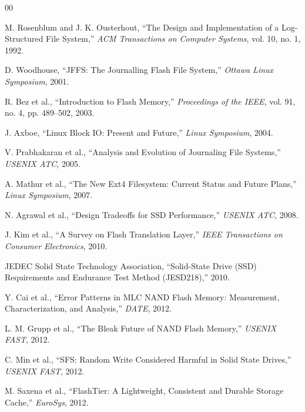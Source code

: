 \documentclass[conference]{IEEEtran}
\begin{document}
\begin{thebibliography}{00}

 M. Rosenblum and J. K. Ousterhout, ``The Design and Implementation of a Log-Structured File System,'' \textit{ACM Transactions on Computer Systems}, vol. 10, no. 1, 1992.

 D. Woodhouse, ``JFFS: The Journalling Flash File System,'' \textit{Ottawa Linux Symposium}, 2001.


 R. Bez et al., ``Introduction to Flash Memory,'' \textit{Proceedings of the IEEE}, vol. 91, no. 4, pp. 489--502, 2003.

 J. Axboe, ``Linux Block IO: Present and Future,'' \textit{Linux Symposium}, 2004.


 V. Prabhakaran et al., ``Analysis and Evolution of Journaling File Systems,'' \textit{USENIX ATC}, 2005.

 A. Mathur et al., ``The New Ext4 Filesystem: Current Status and Future Plans,'' \textit{Linux Symposium}, 2007.

 N. Agrawal et al., ``Design Tradeoffs for SSD Performance,'' \textit{USENIX ATC}, 2008.

 J. Kim et al., ``A Survey on Flash Translation Layer,'' \textit{IEEE Transactions on Consumer Electronics}, 2010.

 JEDEC Solid State Technology Association, ``Solid-State Drive (SSD) Requirements and Endurance Test Method (JESD218),'' 2010.

 Y. Cai et al., ``Error Patterns in MLC NAND Flash Memory: Measurement, Characterization, and Analysis,'' \textit{DATE}, 2012.

 L. M. Grupp et al., ``The Bleak Future of NAND Flash Memory,'' \textit{USENIX FAST}, 2012.


 C. Min et al., ``SFS: Random Write Considered Harmful in Solid State Drives,'' \textit{USENIX FAST}, 2012.


 M. Saxena et al., ``FlashTier: A Lightweight, Consistent and Durable Storage Cache,'' \textit{EuroSys}, 2012.


\end{thebibliography}
\end{document}
